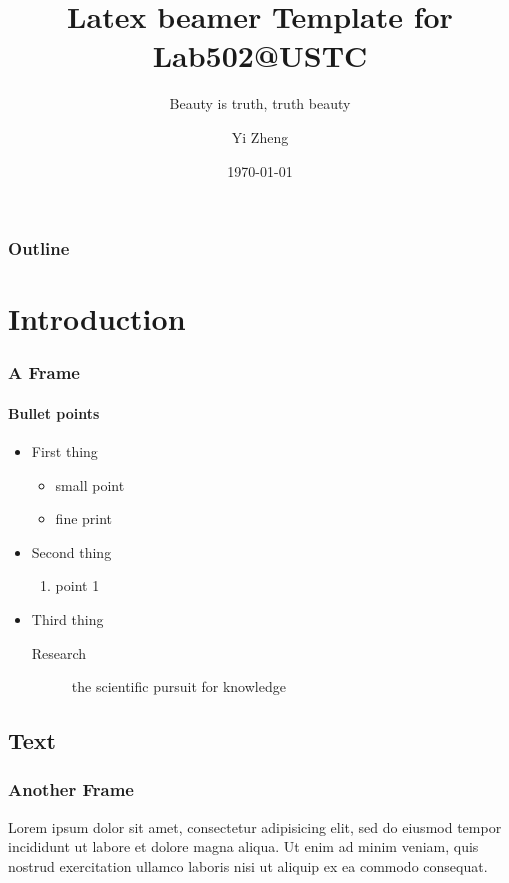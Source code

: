 \documentclass{beamer}
\title{Latex beamer Template for Lab502@USTC}
\subtitle{Beauty is truth, truth beauty}
\author{Yi Zheng}
\date{\today}
\institute{\url{xiaoe@mail.ustc.edu.cn}\\\url{http://morebug.com}}
\begin{document}
\begin{frame}[plain,t]
\titlepage
\end{frame}

\begin{frame}%
	\frametitle{Outline}
\tableofcontents
\end{frame}


\section{Introduction}
\begin{frame}
\frametitle{A Frame}
\framesubtitle{Bullet points}
\begin{itemize}
\item First thing
	\begin{itemize}
	\item small point
	\item fine print
	\end{itemize}
\item Second thing
	\begin{enumerate}
	\item point 1
	\end{enumerate}
\item Third thing
	\begin{description}
	\item[Research] the scientific pursuit for knowledge
	\end{description}
\end{itemize}
\end{frame}

\subsection{Text}
\begin{frame}
\frametitle{Another Frame}
Lorem ipsum dolor sit amet, consectetur adipisicing elit, sed do eiusmod tempor incididunt ut labore et dolore magna aliqua. Ut enim ad minim veniam, quis nostrud exercitation ullamco laboris nisi ut aliquip ex ea commodo consequat.
\end{frame}
\end{document}
